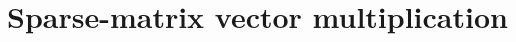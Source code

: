 

\section{Sparse-matrix vector multiplication}
\label{sec:smvm}

\newcommand\spyplot[1]{\parbox[c][1.1cm][c]{1.1cm}{\texttt{[image: images/sec-6/smvm/\#1]}}}

